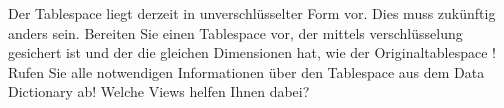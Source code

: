    \item Der Tablespace  liegt derzeit in unverschlüsselter Form vor. Dies muss zukünftig anders sein. Bereiten Sie einen Tablespace  vor, der mittels  verschlüsselung gesichert ist und der die gleichen Dimensionen hat, wie der Originaltablespace ! Rufen Sie alle notwendigen Informationen über den Tablespace  aus dem Data Dictionary ab! Welche Views helfen Ihnen dabei?
